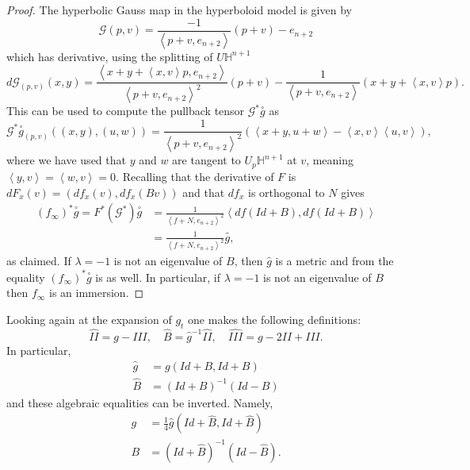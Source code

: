 \documentclass{amsart}
\newcommand{\two}{I\!\!I}
\newcommand{\three}{I\!\!I\!\!I}
\renewcommand{\H}{\mathbb{H}}
\begin{document}
\begin{proof}
The hyperbolic Gauss map in the hyperboloid model is given by 
\[
\mathcal{G}(p,v) = \frac{-1}{\left< p + v, e_{n+2} \right>} (p + v) - e_{n+2}
\]
which has derivative, using the splitting of $U\H^{n+1}$
\[
d\mathcal{G}_{(p,v)}(x,y) = 
\frac{\left< x + y + \left<x,v\right>p, e_{n+2} \right>}{\left< p + v, e_{n+2} \right>^2}(p+v) - \frac{1}{\left< p + v, e_{n+2} \right>}(x + y + \left<x,v\right>p).
\]
This can be used to compute the pullback tensor $\mathcal{G}^*\overset{\circ}{g}$ as
\[
\mathcal{G}^*\overset{\circ}{g}_{(p,v)}((x,y),(u,w))
= \frac{1}{\left< p+v, e_{n+2}\right>^2}\left( \left<x+y,u+w\right> - \left<x,v\right>\left<u,v\right>\right),
\]
where we have used that $y$ and $w$ are tangent to $U_p\H^{n+1}$ at $v$, meaning $\left<y,v\right> = \left<w,v\right> =0$.
Recalling that the derivative of $F$ is $dF_x(v) = (df_x(v),df_x(Bv))$ and that $df_x$ is orthogonal to $N$ gives 
\begin{align*}
(f_\infty)^*\overset{\circ}{g} = F^*(\mathcal{G}^*)\overset{\circ}{g}
&=\frac{1}{\left< f + N , e_{n+2}\right>^2} \left< df(Id + B),df(Id + B)\right> \\
&= \frac{1}{\left< f + N , e_{n+2}\right>^2} \hat{g},
\end{align*}
as claimed.
If $\lambda = -1$ is not an eigenvalue of $B$, then $\hat{g}$ is a metric and from the equality $(f_\infty)^*\overset{\circ}{g}$ is as well. In particular, if $\lambda =-1$ is not an eigenvalue of $B$ then $f_\infty$ is an immersion.
\end{proof}



Looking again at the expansion of $g_t$ one makes the following definitions:
\[
\hat{\two} = g - \three, \quad \hat{B} = \hat{g}^{-1}\hat{\two}, \quad \hat{\three} = g - 2\two + \three.
\]
In particular,
\begin{equation}
\label{TensorsAtInfinity}
\begin{aligned}
\hat{g} &= g(Id+B, Id + B) \\
\hat{B} &= (Id + B)^{-1}(Id-B)
\end{aligned}
\end{equation}
and these algebraic equalities can be inverted. Namely,
\begin{equation}
\label{Tensors}
\begin{aligned} 
g &= \frac{1}{4}\hat{g}(Id + \hat{B}, Id + \hat{B}) \\
B &= (Id + \hat{B})^{-1}(Id - \hat{B}).
\end{aligned}
\end{equation}
\end{document}
